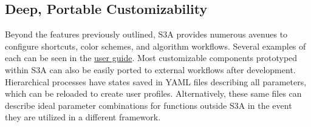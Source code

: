 \makeCropExportsFig

\subsection{Deep, Portable Customizability}
Beyond the features previously outlined, S3A provides numerous avenues to configure shortcuts, color schemes, and algorithm workflows.
Several examples of each can be seen in the \href{https://gitlab.com/s3a/s3a/-/wikis/docs/user's-guide}{user guide}.
Most customizable components prototyped within S3A can also be easily ported to external workflows after development.
Hierarchical processes have states saved in YAML files describing all parameters, which can be reloaded to create user profiles.
Alternatively, these same files can describe ideal parameter combinations for functions outside S3A in the event they are utilized in a different framework.